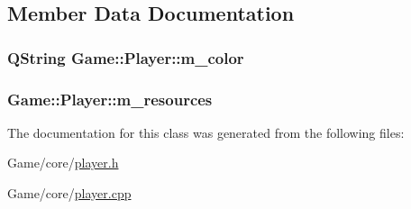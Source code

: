 \subsection{Member Data Documentation}
\hypertarget{classGame_1_1Player_aba8134395ff2502baa9dddbd4ebea5ad}{
\subsubsection[{m\-\_\-color}]{\setlength{\rightskip}{0pt plus 5cm}Q\-String Game\-::\-Player\-::m\-\_\-color\hspace{0.3cm}{\ttfamily [private]}}}\label{classGame_1_1Player_aba8134395ff2502baa9dddbd4ebea5ad}
\hypertarget{classGame_1_1Player_a78e032ef0212488e590267e4bd101400}{
\subsubsection[{m\-\_\-resources}]{ Game\-::\-Player\-::m\-\_\-resources\hspace{0.3cm}{\ttfamily [private]}}}\label{classGame_1_1Player_a78e032ef0212488e590267e4bd101400}


The documentation for this class was generated from the following files\-:\begin{DoxyCompactItemize}
\item 
Game/core/\hyperlink{player_8h}{player.\-h}\item 
Game/core/\hyperlink{player_8cpp}{player.\-cpp}\end{DoxyCompactItemize}
